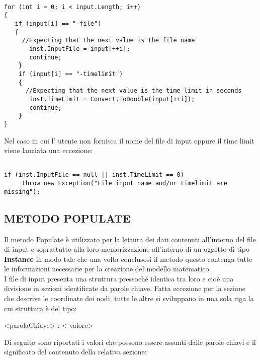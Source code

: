 \documentclass[11pt]{article}
\begin{document}
\begin{lstlisting}

for (int i = 0; i < input.Length; i++)
{
   if (input[i] == "-file")
   {
     //Expecting that the next value is the file name
       inst.InputFile = input[++i];
       continue;
    }
    if (input[i] == "-timelimit")
    {
      //Expecting that the next value is the time limit in seconds
       inst.TimeLimit = Convert.ToDouble(input[++i]);
       continue;
    }
}               
\end{lstlisting}

Nel caso in cui l' utente non fornisca il nome del file di input oppure il time limit viene lanciata una eccezione:

\begin{lstlisting}

if (inst.InputFile == null || inst.TimeLimit == 0)
     throw new Exception("File input name and/or timelimit are missing");

\end{lstlisting}

\subsection*{METODO POPULATE}
\label{sec:MetodoPopulateS}

Il metodo Populate è utilizzato per la lettura dei dati contenuti all'interno del file di input e soprattutto alla loro memorizzazione all'interno di un oggetto di tipo \textbf{Instance} in modo tale che una volta conclusosi il metodo questo contenga tutte le informazioni necessarie per la creazione del modello matematico.\\
I file di input presenta una struttura pressoché identica tra loro e cioè una divisione in sezioni identificate da parole chiave. Fatta eccezione per la sezione che descrive le coordinate dei nodi, tutte le altre si sviluppano in una sola riga la cui struttura è del tipo:

\begin{center}
<parolaChiave> : < valore> 
\end{center}

Di seguito sono riportati i valori che possono essere assunti dalle parole chiavi e il significato del contenuto della relativa sezione: 
\end{document}
